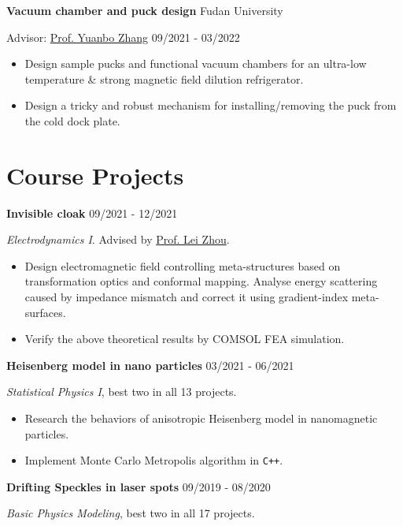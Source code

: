 \documentclass[11pt]{article} %
\begin{document}
\textbf{Vacuum chamber and puck design}
\hfill Fudan University

Advisor: \href{https://scholar.google.com/citations?user=IdLAVPsAAAAJ}{Prof. Yuanbo Zhang}
\hfill 09/2021 - 03/2022

\begin{itemize}
    \item Design sample pucks and functional vacuum chambers for an ultra-low temperature \& strong magnetic field dilution refrigerator.
    \item Design a tricky and robust mechanism for installing/removing the puck from the cold dock plate.
\end{itemize}




\section*{Course Projects}

\textbf{Invisible cloak}
\hfill 09/2021 - 12/2021

{\itshape Electrodynamics I}. Advised by \href{https://scholar.google.com/citations?user=4x9SoV0AAAAJ}{Prof. Lei Zhou}.

\begin{itemize}
    \item Design electromagnetic field controlling meta-structures based on transformation optics and conformal mapping. Analyse energy scattering caused by impedance mismatch and correct it using gradient-index meta-surfaces.
    \item Verify the above theoretical results by COMSOL FEA simulation.
\end{itemize}


\textbf{Heisenberg model in nano particles}
\hfill 03/2021 - 06/2021

{\itshape Statistical Physics I}, best two in all 13 projects.

\begin{itemize}
    \item Research the behaviors of anisotropic Heisenberg model in nanomagnetic particles.
    \item Implement Monte Carlo Metropolis algorithm in \verb|C++|.
\end{itemize}

\textbf{Drifting Speckles in laser spots}
\hfill 09/2019 - 08/2020

{\itshape Basic Physics Modeling}, best two in all 17 projects.
\end{document}
